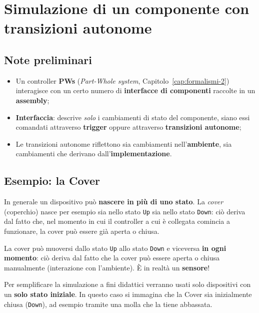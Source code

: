\chapter{Simulazione di un componente con transizioni autonome}
\label{cap:transizioni-autonome}

\section{Note preliminari}
\begin{itemize}
    \item Un controller \textbf{PWs} (\emph{Part-Whole system}, Capitolo~\ref{cap:formalismi-2}) interagisce con un certo numero di \textbf{interfacce di componenti} raccolte in un \textbf{assembly};
    \item \textbf{Interfaccia}: descrive \emph{solo} i cambiamenti di stato del componente, siano essi comandati attraverso \textbf{trigger} oppure attraverso \textbf{transizioni autonome};
    \item Le transizioni autonome riflettono sia cambiamenti nell'\textbf{ambiente}, sia cambiamenti che derivano dall'\textbf{implementazione}.
\end{itemize}

\section{Esempio: la Cover}
In generale un dispositivo può \textbf{nascere in più di uno stato}. La \emph{cover} (coperchio) nasce per esempio sia nello stato \texttt{Up} sia nello stato \texttt{Down}: ciò deriva dal fatto che, nel momento in cui il controller a cui è collegata comincia a funzionare, la cover può essere già aperta o chiusa.

La cover può muoversi dallo stato \texttt{Up} allo stato \texttt{Down} e viceversa \textbf{in ogni momento}: ciò deriva dal fatto che la cover può essere aperta o chiusa manualmente (interazione con l'ambiente). È in realtà un \textbf{sensore}!

\begin{note}
Per semplificare la simulazione a fini didattici verranno usati solo dispositivi con un \textbf{solo stato iniziale}. In questo caso si immagina che la Cover sia inizialmente chiusa (\texttt{Down}), ad esempio tramite una molla che la tiene abbassata.
\end{note}

